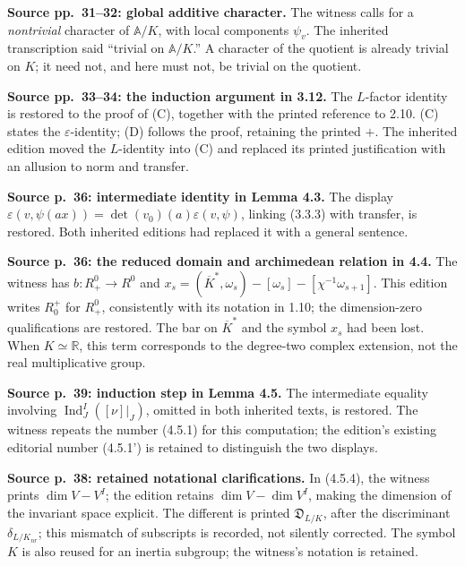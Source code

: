 \documentclass[10pt,letterpaper]{article}
\newcommand{\Ind}{\operatorname{Ind}}
\providecommand{\Ind}{\operatorname{Ind}}
\begin{document}
\begin{description}[style=nextline,leftmargin=2.6em,labelwidth=2.2em,font=\normalfont\bfseries]
\item[E36] \textbf{Source pp.~31--32: global additive character.} The witness calls for a \emph{nontrivial} character of \(\mathbb A/K\), with local components \(\psi_v\). The inherited transcription said “trivial on \(\mathbb A/K\).” A character of the quotient is already trivial on \(K\); it need not, and here must not, be trivial on the quotient.
\item[E37] \textbf{Source pp.~33--34: the induction argument in 3.12.} The \(L\)-factor identity is restored to the proof of (C), together with the printed reference to 2.10. (C) states the \(\varepsilon\)-identity; (D) follows the proof, retaining the printed \(+\). The inherited edition moved the \(L\)-identity into (C) and replaced its printed justification with an allusion to norm and transfer.
\pagebreak
\item[E38] \textbf{Source p.~36: intermediate identity in Lemma 4.3.} The display \(\varepsilon(v,\psi(ax))=\det(v_0)(a)\varepsilon(v,\psi)\), linking (3.3.3) with transfer, is restored. Both inherited editions had replaced it with a general sentence.
\item[E39] \textbf{Source p.~36: the reduced domain and archimedean relation in 4.4.} The witness has \(b:R^0_+\to R^0\) and \(x_s=(\overline K^*,\omega_s)-[\omega_s]-[\chi^{-1}\omega_{s+1}]\). This edition writes \(R^+_0\) for \(R^0_+\), consistently with its notation in 1.10; the dimension-zero qualifications are restored. The bar on \(\overline K^*\) and the symbol \(x_s\) had been lost. When \(K\simeq\mathbb R\), this term corresponds to the degree-two complex extension, not the real multiplicative group.
\item[E40] \textbf{Source p.~39: induction step in Lemma 4.5.}
The intermediate equality involving
\(\Ind_J^I([\nu]|_J)\), omitted in both inherited texts, is restored.
The witness repeats the number (4.5.1) for this computation; the edition's
existing editorial number (4.5.1') is retained to distinguish the two displays.

\item[E41] \textbf{Source p.~38: retained notational clarifications.}
In (4.5.4), the witness prints \(\dim V-V^I\); the edition retains
\(\dim V-\dim V^I\), making the dimension of the invariant space explicit.
The different is printed \(\mathfrak D_{L/K}\), after the discriminant
\(\delta_{L/K_{nr}}\); this mismatch of subscripts is recorded, not silently corrected.
The symbol \(K\) is also reused for an inertia subgroup; the witness's notation is retained.


\end{description}
\end{document}
